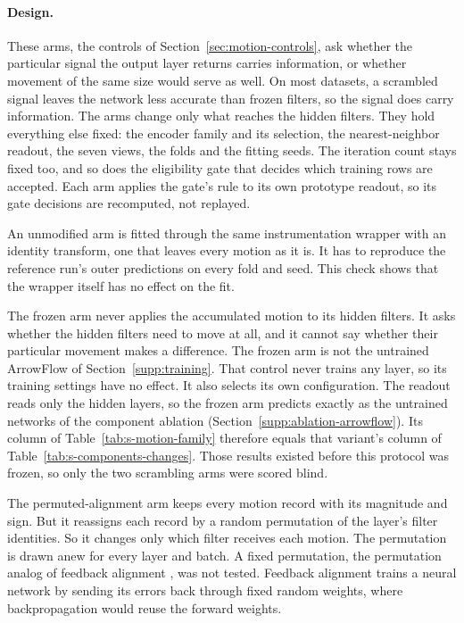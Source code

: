 \paragraph{Design.} These arms, the controls of Section~\ref{sec:motion-controls}, ask whether the particular signal the output layer returns carries information, or whether movement of the same size would serve as well. On most datasets, a scrambled signal leaves the network less accurate than frozen filters, so the signal does carry information. The arms change only what reaches the hidden filters. They hold everything else fixed: the encoder family and its selection, the nearest-neighbor readout, the seven views, the folds and the fitting seeds. The iteration count stays fixed too, and so does the eligibility gate that decides which training rows are accepted. Each arm applies the gate's rule to its own prototype readout, so its gate decisions are recomputed, not replayed.

An unmodified arm is fitted through the same instrumentation wrapper with an identity transform, one that leaves every motion as it is. It has to reproduce the reference run's outer predictions on every fold and seed. This check shows that the wrapper itself has no effect on the fit.

The frozen arm never applies the accumulated motion to its hidden filters. It asks whether the hidden filters need to move at all, and it cannot say whether their particular movement makes a difference. The frozen arm is not the untrained ArrowFlow of Section~\ref{supp:training}. That control never trains any layer, so its training settings have no effect. It also selects its own configuration. The readout reads only the hidden layers, so the frozen arm predicts exactly as the untrained networks of the component ablation (Section~\ref{supp:ablation-arrowflow}). Its column of Table~\ref{tab:s-motion-family} therefore equals that variant's column of Table~\ref{tab:s-components-changes}. Those results existed before this protocol was frozen, so only the two scrambling arms were scored blind.

The permuted-alignment arm keeps every motion record with its magnitude and sign. But it reassigns each record by a random permutation of the layer's filter identities. So it changes only which filter receives each motion. The permutation is drawn anew for every layer and batch. A fixed permutation, the permutation analog of feedback alignment \citep{lillicrap2016random}, was not tested. Feedback alignment trains a neural network by sending its errors back through fixed random weights, where backpropagation would reuse the forward weights.

